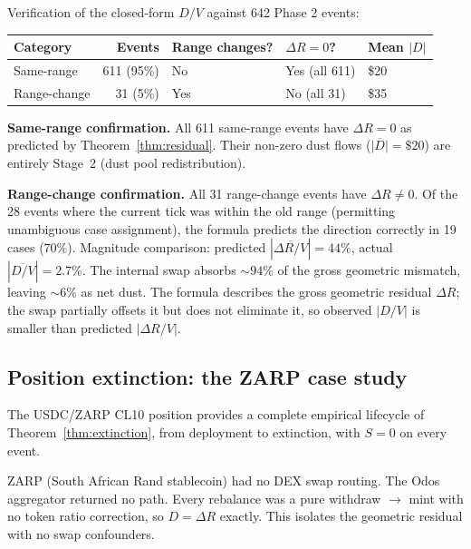 \documentclass[11pt,a4paper]{article}
\begin{document}
Verification of the closed-form $D/V$ against 642 Phase 2 events:

\begin{table}[H]
\centering
\begin{tabular}{@{}lrlll@{}}
\toprule
Category     & Events     & Range changes? & $\Delta R = 0$? & Mean $|D|$ \\
\midrule
Same-range   & 611 (95\%) & No             & Yes (all 611)    & \$20 \\
Range-change & 31 (5\%)   & Yes            & No (all 31)      & \$35 \\
\bottomrule
\end{tabular}
\end{table}

\textbf{Same-range confirmation.} All 611 same-range events have $\Delta R = 0$ as predicted by Theorem~\ref{thm:residual}. Their non-zero dust flows ($\overline{|D|} = \$20$) are entirely Stage~2 (dust pool redistribution).

\textbf{Range-change confirmation.} All 31 range-change events have $\Delta R \neq 0$. Of the 28 events where the current tick was within the old range (permitting unambiguous case assignment), the formula predicts the direction correctly in 19 cases ($70\%$). Magnitude comparison: predicted $|\overline{\Delta R/V}| = 44\%$, actual $|\overline{D/V}| = 2.7\%$. The internal swap absorbs ${\sim}94\%$ of the gross geometric mismatch, leaving ${\sim}6\%$ as net dust. The formula describes the gross geometric residual $\Delta R$; the swap partially offsets it but does not eliminate it, so observed $|D/V|$ is smaller than predicted $|\Delta R/V|$.

\subsection{Position extinction: the ZARP case study}\label{sec:zarp}

The USDC/ZARP CL10 position provides a complete empirical lifecycle of Theorem~\ref{thm:extinction}, from deployment to extinction, with $S = 0$ on every event.

ZARP (South African Rand stablecoin) had no DEX swap routing. The Odos aggregator returned no path. Every rebalance was a pure withdraw $\to$ mint with no token ratio correction, so $D = \Delta R$ exactly. This isolates the geometric residual with no swap confounders.
\end{document}
